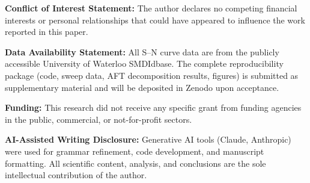 \documentclass[12pt,a4paper]{article}
\begin{document}
\begin{center}
\vspace{0.5cm}
\textbf{Conflict of Interest Statement:} The author declares no competing
financial interests or personal relationships that could have appeared to
influence the work reported in this paper.

\vspace{0.3cm}
\textbf{Data Availability Statement:} All S--N curve data are from the
publicly accessible University of Waterloo SMDIdbase. The complete
reproducibility package (code, sweep data, AFT decomposition results,
figures) is submitted as supplementary material and will be deposited in
Zenodo upon acceptance.

\vspace{0.3cm}
\textbf{Funding:} This research did not receive any specific grant from
funding agencies in the public, commercial, or not-for-profit sectors.

\vspace{0.3cm}
\textbf{AI-Assisted Writing Disclosure:} Generative AI tools (Claude,
Anthropic) were used for grammar refinement, code development, and
manuscript formatting. All scientific content, analysis, and conclusions
are the sole intellectual contribution of the author.

\end{center}
\end{document}
